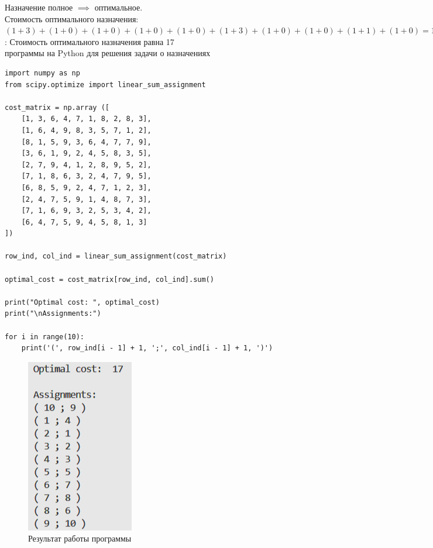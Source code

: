 Назначение полное $\implies$ оптимальное.\\
Стоимость оптимального назначения:\\
\small{$(1 + 3) + (1 + 0) + (1 + 0) + (1 + 0) + (1 + 0) + (1 + 3) + (1 + 0) + (1 + 0) + (1 + 1) + (1 + 0) = 17$}\\

{:} Стоимость оптимального назначения равна 17\\

{ программы на Python для решения задачи о назначениях}

\begin{lstlisting}
import numpy as np
from scipy.optimize import linear_sum_assignment

cost_matrix = np.array ([
    [1, 3, 6, 4, 7, 1, 8, 2, 8, 3],
    [1, 6, 4, 9, 8, 3, 5, 7, 1, 2],
    [8, 1, 5, 9, 3, 6, 4, 7, 7, 9],
    [3, 6, 1, 9, 2, 4, 5, 8, 3, 5],
    [2, 7, 9, 4, 1, 2, 8, 9, 5, 2],
    [7, 1, 8, 6, 3, 2, 4, 7, 9, 5],
    [6, 8, 5, 9, 2, 4, 7, 1, 2, 3],
    [2, 4, 7, 5, 9, 1, 4, 8, 7, 3],
    [7, 1, 6, 9, 3, 2, 5, 3, 4, 2],
    [6, 4, 7, 5, 9, 4, 5, 8, 1, 3]
])

row_ind, col_ind = linear_sum_assignment(cost_matrix)

optimal_cost = cost_matrix[row_ind, col_ind].sum()

print("Optimal cost: ", optimal_cost)
print("\nAssignments:")

for i in range(10):
    print('(', row_ind[i - 1] + 1, ';', col_ind[i - 1] + 1, ')')
\end{lstlisting}

\begin{figure}[ht]
\centering
\includegraphics[]{венгерский метод.png}
\centering
\caption{Результат работы программы}
\end{figure}
